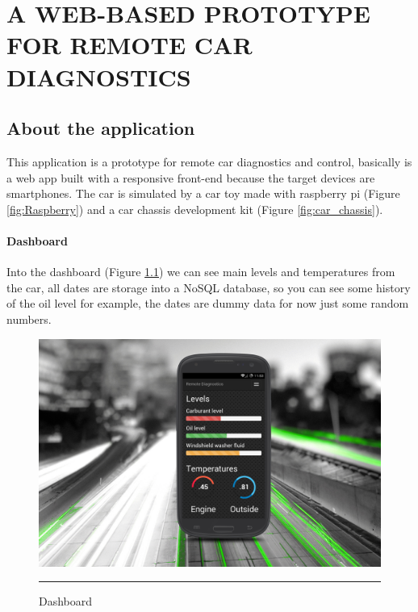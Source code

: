 
\chapter{A WEB-BASED PROTOTYPE FOR REMOTE CAR DIAGNOSTICS} %

\label{Chapter4} %


\section{About the application}
This application is a prototype for remote car diagnostics and control, basically is a web app built with a responsive front-end because the target devices are smartphones.
The car is simulated by a car toy made with raspberry pi (Figure \ref{fig:Raspberry}) and a car chassis development kit (Figure \ref{fig:car_chassis}). 

\subsubsection{Dashboard}
Into the dashboard (Figure \ref{fig:dashboard}) we can see main levels and temperatures from the car, all dates are storage into a NoSQL database, so you can see some history of the oil level for example, the dates are dummy data for now just some random numbers.
\newpage
\begin{figure}[h!]
  \centering
    \includegraphics[width=1\textwidth]{./Pictures/dashboard.jpg}
  \rule{1\textwidth}{1pt}
 \caption{Dashboard}
  \label{fig:dashboard}
\end{figure}
